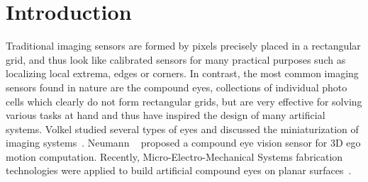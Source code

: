 \section{Introduction}

%


Traditional imaging sensors are formed by pixels precisely placed in a rectangular grid, and thus look like calibrated sensors for many practical purposes such as localizing local extrema, edges or corners.
In contrast, the most common imaging sensors found in nature are the compound eyes,
collections of individual photo cells which clearly do not form rectangular grids, but are very effective for solving %
various tasks at hand and thus have inspired the design of many artificial systems.
%
Volkel \etal studied several types of eyes and discussed the miniaturization of imaging systems~\cite{Volkel03}.
%
Neumann \etal ~\cite{Neumann04} proposed a compound eye vision sensor for 3D ego motion computation.
%
Recently, Micro-Electro-Mechanical Systems fabrication technologies were applied to build artificial compound eyes on planar surfaces~\cite{Di09}.

%

